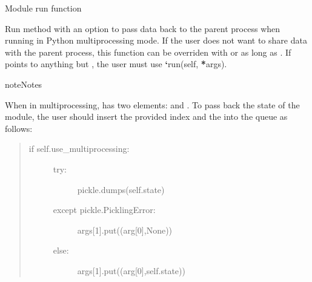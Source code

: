 \documentclass[letterpaper,10pt,openany,oneside,english]{sphinxmanual}
\begin{document}
\begin{fulllineitems}
\begin{fulllineitems}
\begin{quote}
\begin{description}
\begin{itemize}
\end{itemize}

\end{description}\end{quote}

\end{fulllineitems}


\begin{fulllineitems}
\label{\detokenize{examples_rst/arrested:arrested.Arrested.run}}
Module run function

Run method with an option to pass data back to the parent process when running
in Python multiprocessing mode. If the user does not want to share data with
the parent process, this function can be overriden with 
or  as long as .
If  points to anything but , the user must use
{\color{red}\bfseries{}{}`}run(self, {\color{red}\bfseries{}*}args).

\begin{sphinxadmonition}{note}{Notes}

When in multiprocessing,  has two elements:  and .
To pass back the state of the module, the user should insert the provided
index  and the  into the queue as follows:
\begin{quote}
\begin{description}
\item[{if self.use\_multiprocessing:}] \leavevmode\begin{description}
\item[{try:}] \leavevmode
pickle.dumps(self.state)

\item[{except pickle.PicklingError:}] \leavevmode
args{[}1{]}.put((arg{[}0{]},None))

\item[{else:}] \leavevmode
args{[}1{]}.put((arg{[}0{]},self.state))

\end{description}

\end{description}
\end{quote}


\end{sphinxadmonition}
\end{fulllineitems}
\end{fulllineitems}
\end{document}
